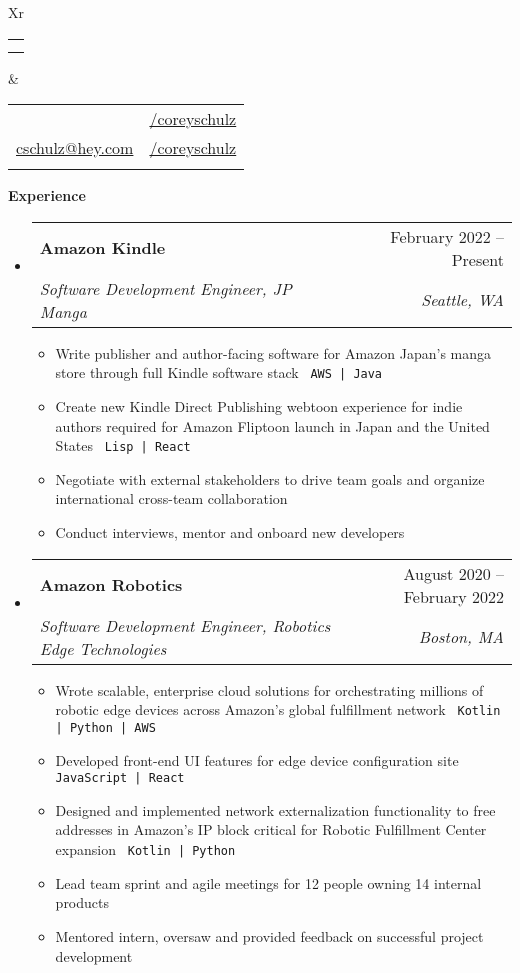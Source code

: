\documentclass[letterpaper,12pt]{article}[leftmargin=*]
\makeatletter
\def \fullname {Corey Schulz}
\def \subtitle { } %
\def \linkedinicon {\faLinkedin}
\def \linkedinlink {https://linkedin.com/in/coreyschulz/}
\def \linkedintext {/coreyschulz}
\def \phoneicon {\faPhone}
\def \phonetext {801.898.6226}
\def \emailicon {\faEnvelope}
\def \emaillink {mailto:cschulz@hey.com}
\def \emailtext {cschulz@hey.com}
\def \githubicon {\faGithub}
\def \githublink {https://github.com/coreyschulz}
\def \githubtext {/coreyschulz}
\def \psicon {\faPlaystation}
\def \headertype {\doublecol} %
\def \entryspacing {-0pt}
\def \linkedin {\linkedinicon \hspace{3pt}\href{\linkedinlink}{\linkedintext}}
\def \phone {\phoneicon \hspace{3pt}{ \phonetext}}
\def \email {\emailicon \hspace{3pt}\href{\emaillink}{\emailtext}}
\def \github {\githubicon \hspace{3pt}\href{\githublink}{\githubtext}}
\def \website {}
\renewcommand{\section}[2]{\vspace{5pt}
  \colorbox{secondary}{\color{white}\raggedbottom\normalsize\textbf{{#1}{\hspace{7pt}#2}}}
}
\newcommand{\resumeEntryStart}{\begin{itemize}[leftmargin=2.5mm]}
\newcommand{\resumeEntryEnd}{\end{itemize}\vspace{\entryspacing}}
\def\code#1{\texttt{#1}}
\newcommand{\resumeItemListStart}{\begin{itemize}[leftmargin=4.5mm]}
\newcommand{\resumeItemListEnd}{\end{itemize}}
\newcommand{\resumeItem}[1]{
  \item\small{
    {#1 \vspace{-2pt}}
  }
}
\newcommand{\resumeEntryTSDL}[4]{
  \vspace{-1pt}\item[]
    \begin{tabularx}{0.97\textwidth}{X@{\hspace{60pt}}r}
      \textbf{\color{primary}#1} & {\firabook\color{accent}\small#2} \\
      \textit{\color{accent}\small#3} & \textit{\color{accent}\small#4} \\
    \end{tabularx}\vspace{-6pt}
}
\newcommand{\doublecol}[6]{
  \begin{tabularx}{\textwidth}{Xr}
    {
      \begin{tabular}[c]{l}
        \fontsize{35}{45}\selectfont{\color{primary}{{\textbf{\fullname}}}} \\
        {\textit{\subtitle}} %
      \end{tabular}
    } & {
      \begin{tabular}[c]{l@{\hspace{1.5em}}l}
        {\small#4} & {\small#1} \\
        {\small#5} & {\small#2} \\
        {\small#6} & {\small#3}
      \end{tabular}
    }
  \end{tabularx}
}
\newcommand{\singlecol}[6]{
  \begin{tabularx}{\textwidth}{Xr}
    {
      \begin{tabular}[b]{l}
        \fontsize{35}{45}\selectfont{\color{primary}{{\textbf{\fullname}}}} \\
        {\textit{\subtitle}} %
      \end{tabular}
    } & {
      \begin{tabular}[c]{l}
        {\small#1} \\
        {\small#2} \\
        {\small#3} \\
        {\small#4} \\
        {\small#5} \\
        {\small#6}
      \end{tabular}
    }
  \end{tabularx}
}
\makeatother
\begin{document}


\headertype{\linkedin}{\github}{\website}{\phone}{\email}{} %
\vspace{-2pt} %


\section{\faCode}{Experience}


  \resumeEntryStart
    \resumeEntryTSDL
      {\faAmazon \hspace{3pt} Amazon Kindle}{February 2022 -- Present}
      {Software Development Engineer, JP Manga}{Seattle, WA}
    \resumeItemListStart
      \resumeItem {Write publisher and author-facing software for Amazon Japan's manga store through full Kindle software stack \code{ AWS | Java }}
      \resumeItem {Create new Kindle Direct Publishing webtoon experience for indie authors required for Amazon Fliptoon launch in Japan and the United States \code{ Lisp | React}}
      \resumeItem {Negotiate with external stakeholders to drive team goals and organize international cross-team collaboration }
      \resumeItem {Conduct interviews, mentor and onboard new developers}
      
    \resumeItemListEnd
  \resumeEntryEnd

  \resumeEntryStart
    \resumeEntryTSDL
      {\faAmazon \hspace{3pt} Amazon Robotics}{August 2020 -- February 2022}
      {Software Development Engineer, Robotics Edge Technologies}{Boston, MA}
    \resumeItemListStart
      \resumeItem {Wrote scalable, enterprise cloud solutions for orchestrating millions of robotic edge devices across Amazon's global fulfillment network \code{ Kotlin | Python | AWS}}
      \resumeItem {Developed front-end UI features for edge device configuration site  \code{ JavaScript | React}}
      \resumeItem {Designed and implemented network externalization functionality to free addresses in Amazon's IP block critical for Robotic Fulfillment Center expansion \code{ Kotlin | Python}}
      \resumeItem {Lead team sprint and agile meetings for 12 people owning 14 internal products}
      \resumeItem {Mentored intern, oversaw and provided feedback on successful project development}      
    \resumeItemListEnd
  \resumeEntryEnd
\end{document}
